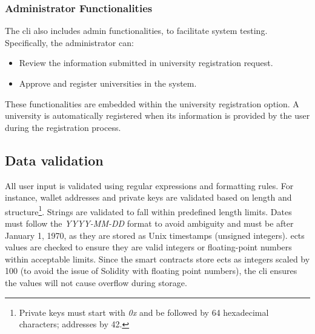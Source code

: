 \subsubsection{Administrator Functionalities}
The \acrshort{cli} also includes admin functionalities, to facilitate system testing. Specifically, the administrator can:
\begin{itemize}
    \item Review the information submitted in university registration request.
    \item Approve and register universities in the system.
\end{itemize}
These functionalities are embedded within the university registration option. A university is automatically registered when its information is provided by the user during the registration process.

\subsection{Data validation}
All user input is validated using regular expressions and formatting rules. For instance, wallet addresses and private keys are validated based on length and structure\footnote{Private keys must start with \textit{0x} and be followed by 64 hexadecimal characters; addresses by 42.}. Strings are validated to fall within predefined length limits. Dates must follow the \textit{YYYY-MM-DD} format to avoid ambiguity and must be after January 1, 1970, as they are stored as Unix timestamps (unsigned integers). \acrshort{ects} values are checked to ensure they are valid integers or floating-point numbers within acceptable limits. Since the smart contracts store \acrshort{ects} as integers scaled by 100 (to avoid the issue of Solidity with floating point numbers), the \acrshort{cli} ensures the values will not cause overflow during storage.